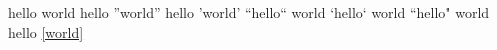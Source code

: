 
hello world              %
hello ''world''          %
hello 'world'            %
``hello`` world          %
`hello` world            %
``hello" world           %
hello \ref{world}        %
